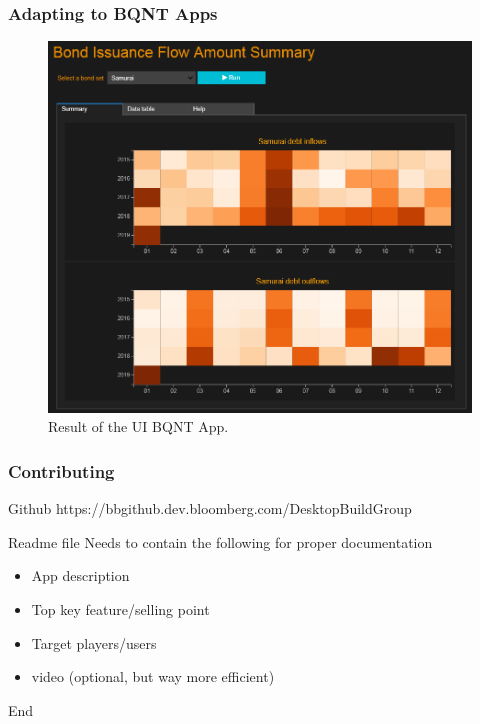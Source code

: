 \documentclass{beamer}
\begin{document}
\begin{frame}
\frametitle{Adapting to BQNT Apps}

\begin{figure}
    \includegraphics[width=0.7\columnwidth]{images/HeatMapApp.png}
    \caption{Result of the UI BQNT App.}
\end{figure}

\end{frame}



\begin{frame}
\frametitle{Contributing}
\begin{block}{Github}
https://bbgithub.dev.bloomberg.com/DesktopBuildGroup
\end{block}

\begin{block}{Readme file}
Needs to contain the following for proper documentation
\begin{itemize}
\item App description
\item Top key feature/selling point
\item Target players/users
\item video (optional, but way more efficient)
\end{itemize}
\end{block}

\end{frame}


\begin{frame}
\Huge{\centerline{End}}
\end{frame}

\end{document}
